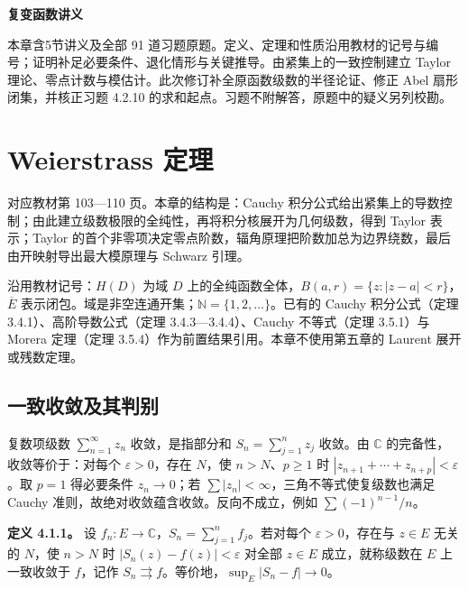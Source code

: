 \documentclass[11pt,a4paper]{article}
\begin{document}
\begin{center}
{\LARGE\bfseries 复变函数讲义\par}
\vspace{8pt}{\large 第四章\quad 全纯函数的 Taylor 展开及其应用\par}
\vspace{6pt}{\small 依史济怀、刘太顺《复变函数》\quad 教材第 103—140 页\par}
\end{center}\vspace{8pt}
本章含5节讲义及全部 91 道习题原题。定义、定理和性质沿用教材的记号与编号；证明补足必要条件、退化情形与关键推导。由紧集上的一致控制建立 Taylor 理论、零点计数与模估计。此次修订补全原函数级数的半径论证、修正 Abel 扇形闭集，并核正习题 4.2.10 的求和起点。习题不附解答，原题中的疑义另列校勘。
\tableofcontents\clearpage
\section{Weierstrass 定理}
对应教材第 103---110 页。本章的结构是：Cauchy
积分公式给出紧集上的导数控制；由此建立级数极限的全纯性，再将积分核展开为几何级数，得到
Taylor 表示；Taylor
的首个非零项决定零点阶数，辐角原理把阶数加总为边界绕数，最后由开映射导出最大模原理与
Schwarz 引理。

沿用教材记号：\(H(D)\) 为域 \(D\)
上的全纯函数全体，\(B(a,r)=\{z:|z-a|<r\}\)，\(\overline E\)
表示闭包。域是非空连通开集；\(\mathbb N=\{1,2,\ldots\}\)。已有的 Cauchy
积分公式（定理 3.4.1）、高阶导数公式（定理 3.4.3---3.4.4）、Cauchy
不等式（定理 3.5.1）与 Morera 定理（定理
3.5.4）作为前置结果引用。本章不使用第五章的 Laurent 展开或残数定理。

\subsection{一致收敛及其判别}\label{ch04-s1-heading-1}

复数项级数 \(\sum_{n=1}^{\infty}z_n\) 收敛，是指部分和
\(S_n=\sum_{j=1}^n z_j\) 收敛。由 \(\mathbb C\)
的完备性，收敛等价于：对每个 \(\varepsilon>0\)，存在 \(N\)，使
\(n>N\)、\(p\ge1\) 时 \(|z_{n+1}+\cdots+z_{n+p}|<\varepsilon\)。取
\(p=1\) 得必要条件 \(z_n\to0\)；若
\(\sum|z_n|<\infty\)，三角不等式使复级数也满足 Cauchy
准则，故绝对收敛蕴含收敛。反向不成立，例如 \(\sum(-1)^{n-1}/n\)。

\textbf{定义 4.1.1。} 设
\(f_n:E\to\mathbb C\)，\(S_n=\sum_{j=1}^n f_j\)。若对每个
\(\varepsilon>0\)，存在与 \(z\in E\) 无关的 \(N\)，使 \(n>N\) 时
\(|S_n(z)-f(z)|<\varepsilon\) 对全部 \(z\in E\) 成立，就称级数在 \(E\)
上一致收敛于 \(f\)，记作
\(S_n\rightrightarrows f\)。等价地，\(\sup_E|S_n-f|\to0\)。
\end{document}
